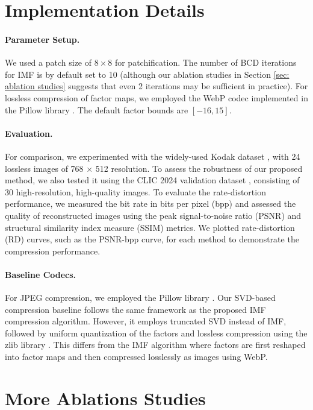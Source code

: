 \section{Implementation Details} \label{sec: implementation details}

\paragraph{Parameter Setup.} We used a patch size of $8 \times 8$ for patchification. The number of BCD iterations for IMF is by default set to 10 (although our ablation studies in Section \ref{sec: ablation studies} suggests that even 2 iterations may be sufficient in practice). For lossless compression of factor maps, we employed the WebP codec implemented in the Pillow library \cite{clark2015pillow}. The default factor bounds are $[-16, 15]$.

\paragraph{Evaluation.} For comparison, we experimented with the widely-used Kodak dataset \cite{kodak1993}, with 24 lossless images of 768 × 512 resolution. To assess the robustness of our proposed method, we also tested it using the CLIC 2024 validation dataset \cite{clic2024}, consisting of 30 high-resolution, high-quality images. To evaluate the rate-distortion performance, we measured the bit rate in bits per pixel (bpp) and assessed the quality of reconstructed images using the peak signal-to-noise ratio (PSNR) and structural similarity index measure (SSIM) metrics. We plotted rate-distortion (RD) curves, such as the PSNR-bpp curve, for each method to demonstrate the compression performance.

\paragraph{Baseline Codecs.} For JPEG compression, we employed the Pillow library \cite{clark2015pillow}. Our SVD-based compression baseline follows the same framework as the proposed IMF compression algorithm. However, it employs truncated SVD instead of IMF, followed by uniform quantization of the factors and lossless compression using the zlib library \cite{deutsch1996zlib}. This differs from the IMF algorithm where factors are first reshaped into factor maps and then compressed losslessly as images using WebP.

\section{More Ablations Studies}

